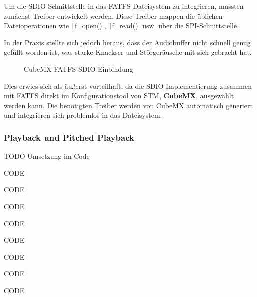 Um die SDIO-Schnittstelle in das FATFS-Dateisystem zu integrieren, mussten zunächst Treiber entwickelt werden. Diese Treiber mappen die üblichen Dateioperationen wie \texttt|f_open()|, \texttt|f_read()| usw. über die SPI-Schnittstelle.


In der Praxis stellte sich jedoch heraus, dass der Audiobuffer nicht schnell genug gefüllt worden ist, was starke Knackser und Störgeräusche mit sich gebracht hat.

\begin{figure} %
	\vspace{-30pt + 0.02\textwidth}
	\hspace{0.02\textwidth} %
	\caption{CubeMX FATFS SDIO Einbindung}
	\label{fig:cubemx_sdio}
\end{figure}

Dies erwies sich als äußerst vorteilhaft, da die SDIO-Implementierung zusammen mit FATFS direkt im Konfigurationstool von STM, \textbf{CubeMX}, ausgewählt werden kann. Die benötigten Treiber werden von CubeMX automatisch generiert und integrieren sich problemlos in das Dateisystem.

\subsubsection{Playback und Pitched Playback}


TODO Umsetzung im Code

CODE 

CODE 

CODE 

CODE 

CODE 

CODE 

CODE

CODE 



